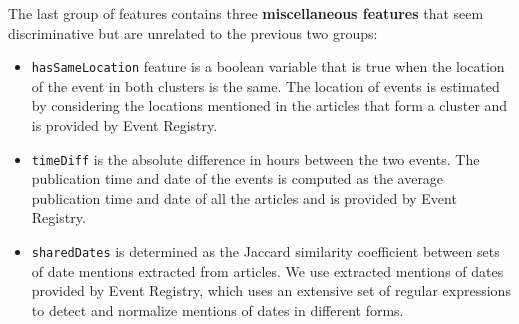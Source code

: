 The last group of features contains three {\bf miscellaneous features} that seem
discriminative but are unrelated to the previous two groups:
\begin{itemize}
\item \texttt{hasSameLocation} feature is a boolean variable that is true when the location of the event
in both clusters is the same. The location of events is estimated by considering the locations mentioned
in the articles that form a cluster and is provided by Event Registry.
\item \texttt{timeDiff} is the absolute difference in hours between the two events. The publication time
and date of the events is computed as the average publication time and date of all the articles and is
provided by Event Registry.
\item \texttt{sharedDates} is determined as the Jaccard similarity coefficient between sets of date
mentions extracted from articles. We use extracted mentions of dates provided by Event Registry, which
uses an extensive set of regular expressions to detect and normalize mentions of dates in different forms.
\end{itemize}

